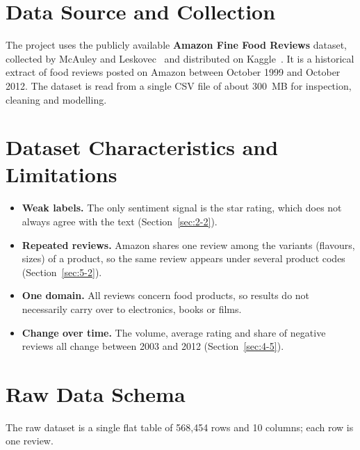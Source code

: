 \section{Data Source and Collection}
\label{sec:3-1}

The project uses the publicly available \textbf{Amazon Fine Food Reviews} dataset, collected by McAuley and Leskovec~\cite{mcauley2013} and distributed on Kaggle~\cite{kaggle_fine_food}. It is a historical extract of food reviews posted on Amazon between October 1999 and October 2012. The dataset is read from a single CSV file of about 300~MB for inspection, cleaning and modelling.

\section{Dataset Characteristics and Limitations}
\label{sec:3-2}

\begin{itemize}
    \item \textbf{Weak labels.} The only sentiment signal is the star rating, which does not always agree with the text (Section~\ref{sec:2-2}).
    \item \textbf{Repeated reviews.} Amazon shares one review among the variants (flavours, sizes) of a product, so the same review appears under several product codes (Section~\ref{sec:5-2}).
    \item \textbf{One domain.} All reviews concern food products, so results do not necessarily carry over to electronics, books or films.
    \item \textbf{Change over time.} The volume, average rating and share of negative reviews all change between 2003 and 2012 (Section~\ref{sec:4-5}).
\end{itemize}

\section{Raw Data Schema}
\label{sec:3-3}

The raw dataset is a single flat table of 568{,}454 rows and 10 columns; each row is one review.

